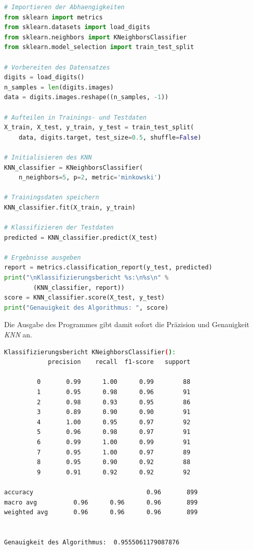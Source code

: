 \begin{minipage}{\textwidth}
    \begin{lstlisting}[language=Python, caption=Pythoncode zum Testen des KNN, label=lst:test_knn]
# Importieren der Abhaengigkeiten
from sklearn import metrics
from sklearn.datasets import load_digits
from sklearn.neighbors import KNeighborsClassifier
from sklearn.model_selection import train_test_split

# Vorbereiten des Datensatzes
digits = load_digits()
n_samples = len(digits.images)
data = digits.images.reshape((n_samples, -1))

# Aufteilen in Trainings- und Testdaten
X_train, X_test, y_train, y_test = train_test_split(
    data, digits.target, test_size=0.5, shuffle=False)

# Initialisieren des KNN
KNN_classifier = KNeighborsClassifier(
    n_neighbors=5, p=2, metric='minkowski')

# Trainingsdaten speichern
KNN_classifier.fit(X_train, y_train)

# Klassifizieren der Testdaten
predicted = KNN_classifier.predict(X_test)

# Ergebnisse ausgeben
report = metrics.classification_report(y_test, predicted)
print("\nKlassifizierungsbericht %s:\n%s\n" %
        (KNN_classifier, report))
score = KNN_classifier.score(X_test, y_test)
print("Genauigkeit des Algorithmus: ", score)
    \end{lstlisting}
\end{minipage}
Die Ausgabe des Programmes gibt damit sofort die Präzision und Genauigkeit \textit{KNN} an.\par
\begin{minipage}{\textwidth}
    \begin{lstlisting}[language=Bash, caption=Testergebnisse des KNN, label=lst:testergebnis_knn]
        Klassifizierungsbericht KNeighborsClassifier():
            precision    recall  f1-score   support

         0       0.99      1.00      0.99        88
         1       0.95      0.98      0.96        91
         2       0.98      0.93      0.95        86
         3       0.89      0.90      0.90        91
         4       1.00      0.95      0.97        92
         5       0.96      0.98      0.97        91
         6       0.99      1.00      0.99        91
         7       0.95      1.00      0.97        89
         8       0.95      0.90      0.92        88
         9       0.91      0.92      0.92        92

accuracy                               0.96       899
macro avg          0.96      0.96      0.96       899
weighted avg       0.96      0.96      0.96       899


Genauigkeit des Algorithmus:  0.9555061179087876
    \end{lstlisting}
\end{minipage}
